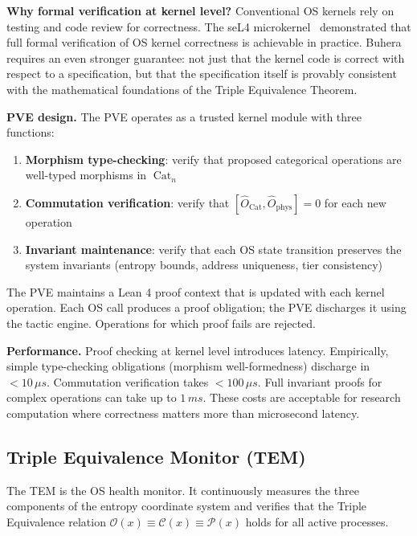 \documentclass[12pt,twocolumn]{article}
\DeclareMathOperator{\Cat}{Cat}
\begin{document}
\textbf{Why formal verification at kernel level?} Conventional OS kernels rely on testing and code review for correctness. The seL4 microkernel~\cite{klein2009sel4} demonstrated that full formal verification of OS kernel correctness is achievable in practice. Buhera requires an even stronger guarantee: not just that the kernel code is correct with respect to a specification, but that the specification itself is provably consistent with the mathematical foundations of the Triple Equivalence Theorem.

\textbf{PVE design.} The PVE operates as a trusted kernel module with three functions:

\begin{enumerate}
\item \textbf{Morphism type-checking}: verify that proposed categorical operations are well-typed morphisms in $\Cat_n$
\item \textbf{Commutation verification}: verify that $[\hat{O}_{\Cat}, \hat{O}_{\text{phys}}] = 0$ for each new operation
\item \textbf{Invariant maintenance}: verify that each OS state transition preserves the system invariants (entropy bounds, address uniqueness, tier consistency)
\end{enumerate}

The PVE maintains a Lean 4 proof context that is updated with each kernel operation. Each OS call produces a proof obligation; the PVE discharges it using the tactic engine. Operations for which proof fails are rejected.

\textbf{Performance.} Proof checking at kernel level introduces latency. Empirically, simple type-checking obligations (morphism well-formedness) discharge in $< 10\,\mu s$. Commutation verification takes $< 100\,\mu s$. Full invariant proofs for complex operations can take up to $1\,ms$. These costs are acceptable for research computation where correctness matters more than microsecond latency.

\subsection{Triple Equivalence Monitor (TEM)}

The TEM is the OS health monitor. It continuously measures the three components of the entropy coordinate system and verifies that the Triple Equivalence relation $\mathcal{O}(x) \equiv \mathcal{C}(x) \equiv \mathcal{P}(x)$ holds for all active processes.
\end{document}
